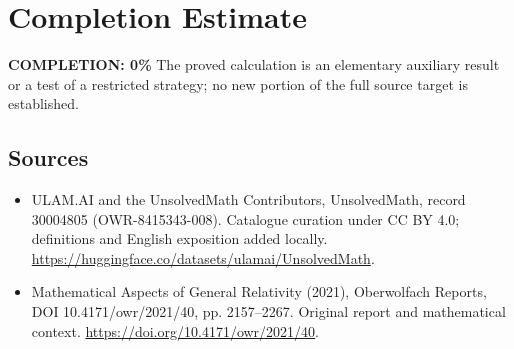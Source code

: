 \documentclass[11pt]{article}
\begin{document}
\section{Completion Estimate}
\noindent\textbf{COMPLETION: 0\%}
The proved calculation is an elementary auxiliary result or a test of a restricted strategy; no new portion of the full source target is established.

\subsection{Sources}
\begin{itemize}
\item[\hypertarget{source:30004805:1}{S1}] ULAM.AI and the UnsolvedMath Contributors, UnsolvedMath, record 30004805 (OWR-8415343-008). Catalogue curation under CC BY 4.0; definitions and English exposition added locally.
\url{https://huggingface.co/datasets/ulamai/UnsolvedMath}.
\item[\hypertarget{source:30004805:2}{S2}] Mathematical Aspects of General Relativity (2021), Oberwolfach Reports, DOI 10.4171/owr/2021/40, pp. 2157--2267. Original report and mathematical context.
\url{https://doi.org/10.4171/owr/2021/40}.
\end{itemize}
\label{end:30004805}
\end{document}
